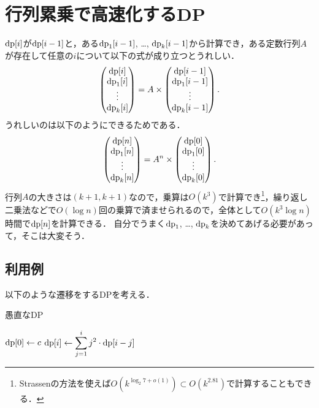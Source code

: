 \documentclass{jsarticle}
\newcommand{\DP}{\ensuremath\mathrm{dp}}
\begin{document}
\section{行列累乗で高速化するDP}

$\DP[i]$が$\DP[i-1]$と，ある$\DP_1[i-1]$, \dots, $\DP_k[i-1]$から計算でき，ある定数行列$A$が存在して任意の$i$について以下の式が成り立つとうれしい．
\[
\left(\begin{matrix}
  \DP[i]\\
  \DP_1[i]\\
  \vdots\\
  \DP_k[i]
\end{matrix}\right) = A \times \left(\begin{matrix}
  \DP[i-1]\\
  \DP_1[i-1]\\
  \vdots\\
  \DP_k[i-1]
\end{matrix}\right).
\]
うれしいのは以下のようにできるためである．
\[
\left(\begin{matrix}
  \DP[n]\\
  \DP_1[n]\\
  \vdots\\
  \DP_k[n]
\end{matrix}\right) = A^n \times \left(\begin{matrix}
  \DP[0]\\
  \DP_1[0]\\
  \vdots\\
  \DP_k[0]
\end{matrix}\right).
\]
行列$A$の大きさは$(k+1, k+1)$なので，乗算は$O(k^3)$で計算でき\footnote{Strassenの方法を使えば$O(k^{\log_2 7+o(1)})\subset O(k^{2.81})$で計算することもできる．}，繰り返し二乗法などで$O(\log n)$回の乗算で済ませられるので，全体として$O(k^3 \log n)$時間で$\DP[n]$を計算できる．
自分でうまく$\DP_1$, \dots, $\DP_k$を決めてあげる必要があって，そこは大変そう．

\subsection{利用例}
以下のような遷移をするDPを考える．
\begin{alg}
  \caption{愚直なDP}
  {$\DP[0] \gets c$}
  {
    {$\displaystyle\DP[i] \gets \sum_{j=1}^i j^2\cdot\DP[i-j]$}\;
  }
\end{alg}
\end{document}
